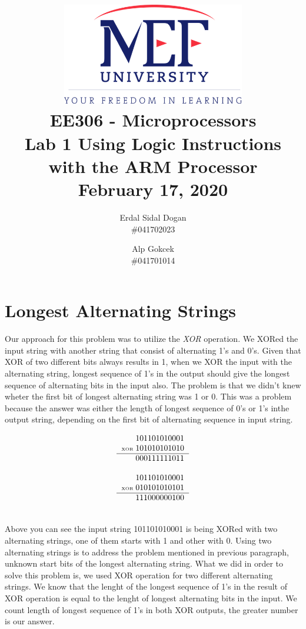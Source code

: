\documentclass[titlepage]{article}
\date{}
\author{Erdal Sidal Dogan\\ \#041702023  \and Alp
	Gokcek \\ \#041701014}
\title{\includegraphics[width=0.6\textwidth]{../images/logo_en_color.png}\\ 
\vspace{5em}
EE306 - Microprocessors\\
\vspace{2em}
\textbf{Lab 1 \linebreak Using Logic Instructions with the ARM Processor
}\\
\vspace{1.5em}
February 17, 2020}
\begin{document}
	\maketitle
	\section{Longest Alternating Strings}
	Our approach for this problem was to utilize the \emph{XOR} operation. We XORed the input string with another string that consist of alternating 1's and 0's. Given that XOR of two different bits always results in 1, when we XOR the input  with the alternating string, longest sequence of 1's in the output should give the longest sequence of alternating bits in the input also. The problem is that we didn't knew wheter the first bit of longest alternating string was 1 or 0.  This was a problem because the answer was either the length of longest sequence of 0's or 1's inthe output string, depending on the first bit of alternating sequence in input string.  \\
	
	\begin{minipage}{0.5\textwidth}
		\begin{equation*}
			\begin{tabular}{r@{\;}r}
				& 101101010001  \\
				\tiny{XOR} & 101010101010\\
				\hline
				& 000111111011
			\end{tabular}
		\end{equation*}
	\end{minipage}
	\quad
	\begin{minipage}{0.35\textwidth}
		\begin{equation*}
				\begin{tabular}{r@{\;}r}
				& 101101010001  \\
				\tiny{XOR} & 010101010101\\
				\hline
				& 111000000100
			\end{tabular}
		\end{equation*}
	\end{minipage}
	\\

	Above you can see the input string 101101010001 is being XORed with two alternating strings, one of them starts with 1 and other with 0. Using two alternating strings is to address the problem mentioned in previous paragraph, unknown start bits of the longest alternating string. What we did in order to solve this problem is, we used XOR operation for two different alternating strings. We know that the lenght of the longest sequence of 1's in the result of XOR operation is equal to the lenght of longest alternating bits in the input. We count length of longest sequence of 1's in both XOR outputs, the greater number is our answer.\\
	
\end{document}
